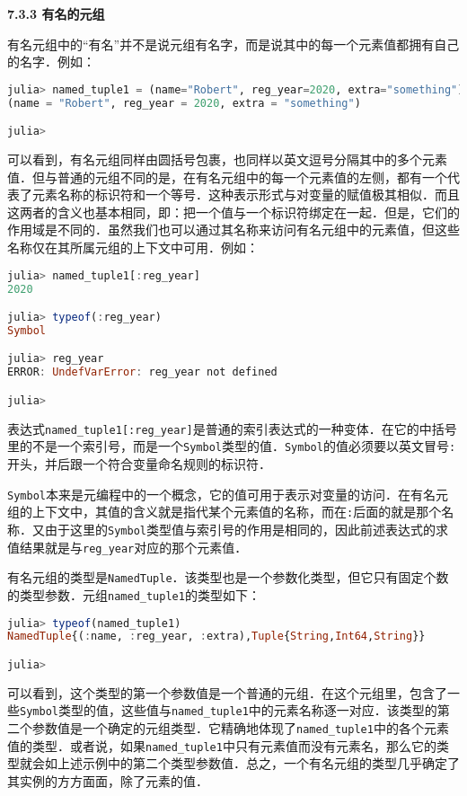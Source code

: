 \textbf{7.3.3 有名的元组}

有名元组中的“有名”并不是说元组有名字，而是说其中的每一个元素值都拥有自己的名字．例如：
\begin{lstlisting}[language=julia]
julia> named_tuple1 = (name="Robert", reg_year=2020, extra="something")
(name = "Robert", reg_year = 2020, extra = "something")

julia> 
\end{lstlisting}

可以看到，有名元组同样由圆括号包裹，也同样以英文逗号分隔其中的多个元素值．但与普通的元组不同的是，在有名元组中的每一个元素值的左侧，都有一个代表了元素名称的标识符和一个等号．这种表示形式与对变量的赋值极其相似．而且这两者的含义也基本相同，即：把一个值与一个标识符绑定在一起．但是，它们的作用域是不同的．虽然我们也可以通过其名称来访问有名元组中的元素值，但这些名称仅在其所属元组的上下文中可用．例如：
\begin{lstlisting}[language=julia]
julia> named_tuple1[:reg_year]
2020

julia> typeof(:reg_year)
Symbol

julia> reg_year
ERROR: UndefVarError: reg_year not defined

julia> 
\end{lstlisting}

表达式\verb|named_tuple1[:reg_year]|是普通的索引表达式的一种变体．在它的中括号里的不是一个索引号，而是一个\verb|Symbol|类型的值．\verb|Symbol|的值必须要以英文冒号\verb|:|开头，并后跟一个符合变量命名规则的标识符．

\verb|Symbol|本来是元编程中的一个概念，它的值可用于表示对变量的访问．在有名元组的上下文中，其值的含义就是指代某个元素值的名称，而在\verb|:|后面的就是那个名称．又由于这里的\verb|Symbol|类型值与索引号的作用是相同的，因此前述表达式的求值结果就是与\verb|reg_year|对应的那个元素值．

有名元组的类型是\verb|NamedTuple|．该类型也是一个参数化类型，但它只有固定个数的类型参数．元组\verb|named_tuple1|的类型如下：
\begin{lstlisting}[language=julia]
julia> typeof(named_tuple1)
NamedTuple{(:name, :reg_year, :extra),Tuple{String,Int64,String}}

julia> 
\end{lstlisting}

可以看到，这个类型的第一个参数值是一个普通的元组．在这个元组里，包含了一些\verb|Symbol|类型的值，这些值与\verb|named_tuple1|中的元素名称逐一对应．该类型的第二个参数值是一个确定的元组类型．它精确地体现了\verb|named_tuple1|中的各个元素值的类型．或者说，如果\verb|named_tuple1|中只有元素值而没有元素名，那么它的类型就会如上述示例中的第二个类型参数值．总之，一个有名元组的类型几乎确定了其实例的方方面面，除了元素的值．

